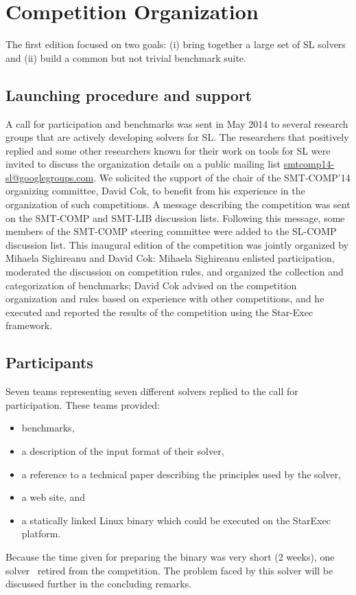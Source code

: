 \documentclass{llncs}
\begin{document}
\section{Competition Organization}

The first edition focused on two goals:
(i) bring together a large set of SL solvers and
(ii) build a common but not trivial benchmark suite. 

\subsection{Launching procedure and support}
A call for participation and benchmarks was sent
in May 2014 %
to several research groups 
that are actively developing solvers for SL.
The researchers that positively replied and some other researchers known for their work on tools for SL were invited to discuss the organization details on a public mailing list \url{smtcomp14-sl@googlegroups.com}.
We solicited the support of the chair of the SMT-COMP'14 organizing committee, David Cok, to benefit from his experience in the organization of such competitions.
A message describing the competition was sent on the SMT-COMP and SMT-LIB discussion lists. Following this message, some members of the SMT-COMP steering committee were added to the SL-COMP discussion list. 
This inaugural edition of the competition was jointly organized by Mihaela Sighireanu and David Cok:
Mihaela Sighireanu enlisted participation, moderated the discussion on competition rules, and organized the 
collection and categorization of benchmarks; David Cok advised on the competition organization and rules based on experience with other competitions, and he executed and reported the results of the competition using the Star-Exec framework.


\subsection{Participants}
Seven teams representing seven different solvers replied to the call for participation.
These teams provided:
\begin{itemize}
\item benchmarks, 
\item a description of the input format of their solver, 
\item a reference to a technical paper describing the principles used by the solver, 
\item a web site, and
\item a statically linked Linux binary which could be executed on the StarExec platform.
\end{itemize}
Because the time given for preparing the binary was very short (2 weeks), one solver~\cite{HasseIOP13}
retired from the competition. The problem faced by this solver will be discussed further in the concluding remarks.
\end{document}
